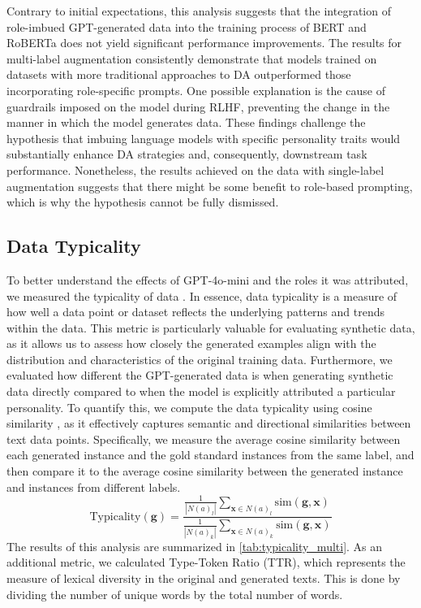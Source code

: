 \documentclass[manuscript]{clv3}
\begin{document}
Contrary to initial expectations, this analysis suggests that the integration of role-imbued GPT-generated data into the training process of BERT and RoBERTa does not yield significant performance improvements. The results for multi-label augmentation consistently demonstrate that models trained on datasets with more traditional approaches to DA outperformed those incorporating role-specific prompts. One possible explanation is the cause of guardrails imposed on the model during RLHF, preventing the change in the manner in which the model generates data. These findings challenge the hypothesis that imbuing language models with specific personality traits would substantially enhance DA strategies and, consequently, downstream task performance. Nonetheless, the results achieved on the data with single-label augmentation suggests that there might be some benefit to role-based prompting, which is why the hypothesis cannot be fully dismissed.

\subsection{Data Typicality}
To better understand the effects of GPT-4o-mini and the roles it was attributed, we measured the typicality of data \cite{ZHANG1992470}. In essence, data typicality is a measure of how well a data point or dataset reflects the underlying patterns and trends within the data. This metric is particularly valuable for evaluating synthetic data, as it allows us to assess how closely the generated examples align with the distribution and characteristics of the original training data. Furthermore, we evaluated how different the GPT-generated data is when generating synthetic data directly compared to when the model is explicitly attributed a particular personality. To quantify this, we compute the data typicality using cosine similarity \cite{van-nooten-daelemans-2023-improving}, as it effectively captures semantic and directional similarities between text data points. Specifically, we measure the average cosine similarity between each generated instance and the gold standard instances from the same label, and then compare it to the average cosine similarity between the generated instance and instances from different labels.
\begin{equation}
\text{Typicality}(\mathbf{g}) = \frac{ \frac{1}{|N(a)_l|} \sum_{\mathbf{x} \in N(a)_l} \text{sim}(\mathbf{g}, \mathbf{x}) }{ \frac{1}{|N(a)_k|} \sum_{\mathbf{x} \in N(a)_k} \text{sim}(\mathbf{g}, \mathbf{x}) }
\end{equation}
The results of this analysis are summarized in \autoref{tab:typicality_multi}. As an additional metric, we calculated Type-Token Ratio (TTR), which represents the measure of lexical diversity in the original and generated texts. This is done by dividing the number of unique words by the total number of words.
\end{document}
